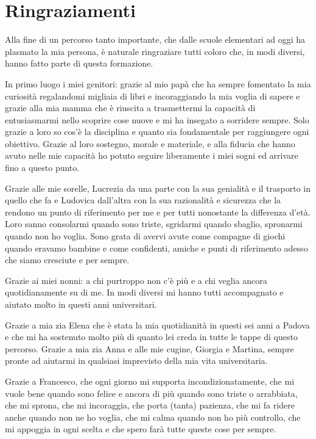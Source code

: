 \chapter*{Ringraziamenti}
Alla fine di un percorso tanto importante, che dalle scuole elementari ad oggi ha plasmato la mia persona, è naturale ringraziare tutti coloro che, in modi diversi, hanno fatto parte di questa formazione.

In primo luogo i miei genitori: grazie al mio papà che ha sempre fomentato la mia curiosità regalandomi migliaia di libri e incoraggiando la mia voglia di sapere e grazie alla mia mamma che è riuscita a trasmettermi la capacità di entusiasmarmi nello scoprire cose nuove e mi ha insegato a sorridere sempre. Solo grazie a loro so cos'è la disciplina e quanto sia fondamentale per raggiungere ogni obiettivo. Grazie al loro sostegno, morale e materiale, e alla fiducia che hanno avuto nelle mie capacità ho potuto seguire liberamente i miei sogni ed arrivare fino a questo punto. 

Grazie alle mie sorelle, Lucrezia da una parte con la sua genialità e il trasporto in quello che fa e Ludovica dall'altra con la sua razionalità e sicurezza che la rendono un punto di riferimento per me e per tutti nonostante la differenza d'età. Loro sanno consolarmi quando sono triste, sgridarmi quando sbaglio, spronarmi quando non ho voglia. Sono grata di avervi avute come compagne di giochi quando eravamo bambine e come confidenti, amiche e punti di riferimento adesso che siamo cresciute e per sempre. 

Grazie ai miei nonni: a chi purtroppo non c'è più e a chi veglia ancora quotidianamente su di me. In modi diversi mi hanno tutti accompagnato e aiutato molto in questi anni universitari. 

Grazie a mia zia Elena che è stata la mia quotidianità in questi sei anni a Padova e che mi ha sostenuto molto più di quanto lei creda in tutte le tappe di questo percorso. Grazie a mia zia Anna e alle mie cugine, Giorgia e Martina, sempre pronte ad aiutarmi in qualsiasi imprevisto della mia vita universitaria.

Grazie a Francesco, che ogni giorno mi supporta incondizionatamente, che mi vuole bene quando sono felice e ancora di più quando sono triste o arrabbiata, che mi sprona, che mi incoraggia, che porta (tanta) pazienza, che mi fa ridere anche quando non ne ho voglia, che mi calma quando non ho più controllo, che mi appoggia in ogni scelta e che spero farà tutte queste cose per sempre.

